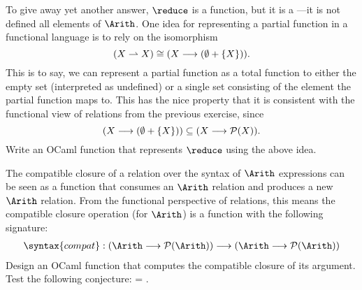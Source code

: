 \begin{exercise}
To give away yet another answer, $\reduce$ is a function, but it is a
---it is not defined all elements of
$\Arith$.  One idea for representing a partial function in a
functional language is to rely on the isomorphism
\[
(X \rightharpoonup X) \cong (X \longrightarrow (\emptyset + \{X\}))\text.
\]
This is to say, we can represent a partial function as a total
function to either the empty set (interpreted as undefined) or a
single set consisting of the element the partial function maps to.
This has the nice property that it is consistent with the functional
view of relations from the previous exercise, since
\[
(X \longrightarrow (\emptyset + \{X\})) \subseteq
(X \longrightarrow \mathcal{P}(X))\text.
\]
Write an OCaml function  that represents $\reduce$
using the above idea.
\end{exercise}

\begin{exercise}
The compatible closure of a relation over the syntax of $\Arith$
expressions can be seen as a function that consumes an $\Arith$
relation and produces a new $\Arith$ relation. From the functional
perspective of relations, this means the compatible closure operation
(for $\Arith$) is a function with the following signature:
\begin{align*}
\syntax{compat} : (\Arith \longrightarrow \mathcal{P}(\Arith)) \longrightarrow (\Arith \longrightarrow \mathcal{P}(\Arith))
\end{align*}
%
Design an OCaml function  that computes the compatible
closure of its argument.  Test the following conjecture: 
= .
\end{exercise}

